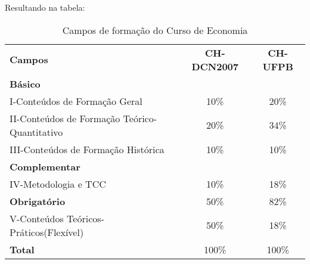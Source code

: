 \documentclass[12pt,a4paper]{article}
\begin{document}
Resultando na tabela:
\\
\begin{table}[H]
	
	\caption{Campos de formação do Curso de Economia}
	
	\centering
	
	\begin{tabular}{ l | c c }
		
		
		\hline
		
		\textbf{Campos} & \textbf{CH-DCN2007} & \textbf{CH-UFPB} \\
		
		\cline{2-3} 
		
		\textbf{Básico}\\  
		I-Conteúdos de Formação Geral 	& 10\% &20\% \\
		II-Conteúdos de Formação Teórico-Quantitativo & 20\% & 34\% \\
		III-Conteúdos de Formação Histórica  & 10\% & 10\% \\
		
		\textbf{Complementar}\\  
		IV-Metodologia e TCC & 10\% & 18\% \\
		
		\textbf{Obrigatório} 	& 50\% & 82\% \\ 
		V-Conteúdos Teóricos-Práticos(Flexível)	& 50\% & 18\% \\ \hline
		
		\textbf{Total} 	& 100\% & 100\% \\ \hline
	\end{tabular}
\end{table}



	
\end{document}
